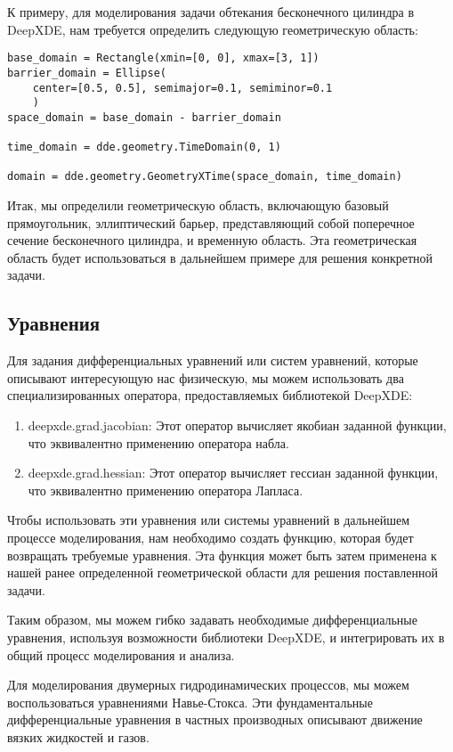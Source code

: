 К примеру, для моделирования задачи обтекания бесконечного цилиндра в DeepXDE, нам требуется определить следующую 
геометрическую область:
\begin{verbatim}
base_domain = Rectangle(xmin=[0, 0], xmax=[3, 1])
barrier_domain = Ellipse(
    center=[0.5, 0.5], semimajor=0.1, semiminor=0.1
    )
space_domain = base_domain - barrier_domain

time_domain = dde.geometry.TimeDomain(0, 1)

domain = dde.geometry.GeometryXTime(space_domain, time_domain)
\end{verbatim}
Итак, мы определили геометрическую область, включающую базовый прямоугольник, эллиптический барьер, представляющий
собой поперечное сечение бесконечного цилиндра, и временную область. Эта геометрическая область будет использоваться
в дальнейшем примере для решения конкретной задачи.

\subsection{Уравнения}
Для задания дифференциальных уравнений или систем уравнений, которые описывают интересующую нас физическую,
мы можем использовать два специализированных оператора, предоставляемых библиотекой DeepXDE:
\begin{enumerate}
    \item deepxde.grad.jacobian: Этот оператор вычисляет якобиан заданной функции, что эквивалентно применению
    оператора набла.
    \item deepxde.grad.hessian: Этот оператор вычисляет гессиан заданной функции, что эквивалентно применению
    оператора Лапласа.
\end{enumerate}
Чтобы использовать эти уравнения или системы уравнений в дальнейшем процессе моделирования, нам необходимо создать
функцию, которая будет возвращать требуемые уравнения. Эта функция может быть затем применена к нашей ранее
определенной геометрической области для решения поставленной задачи.

Таким образом, мы можем гибко задавать необходимые дифференциальные уравнения, используя возможности библиотеки DeepXDE,
и интегрировать их в общий процесс моделирования и анализа.

Для моделирования двумерных гидродинамических процессов, мы можем воспользоваться уравнениями Навье-Стокса.
Эти фундаментальные дифференциальные уравнения в частных производных описывают движение вязких жидкостей и газов.

